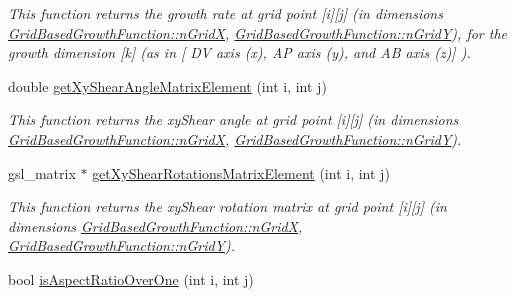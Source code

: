 \begin{DoxyCompactItemize}
\begin{DoxyCompactList}\small\item\em This function returns the growth rate at grid point \mbox{[}i\mbox{]}\mbox{[}j\mbox{]} (in dimensions \hyperlink{classGridBasedGrowthFunction_a6d36f433ad29dd4f36352900d3795469}{Grid\+Based\+Growth\+Function\+::n\+Grid\+X}, \hyperlink{classGridBasedGrowthFunction_ac992521b24e1975df1c7372c11285217}{Grid\+Based\+Growth\+Function\+::n\+Grid\+Y}), for the growth dimension \mbox{[}k\mbox{]} (as in \mbox{[} D\+V axis (x), A\+P axis (y), and A\+B axis (z)\mbox{]} ). \end{DoxyCompactList}\item 
\hypertarget{classGridBasedGrowthFunction_a5075a53329b3a0b73a5864b7ffb37c5d}{}double \hyperlink{classGridBasedGrowthFunction_a5075a53329b3a0b73a5864b7ffb37c5d}{get\+Xy\+Shear\+Angle\+Matrix\+Element} (int i, int j)\label{classGridBasedGrowthFunction_a5075a53329b3a0b73a5864b7ffb37c5d}

\begin{DoxyCompactList}\small\item\em This function returns the xy\+Shear angle at grid point \mbox{[}i\mbox{]}\mbox{[}j\mbox{]} (in dimensions \hyperlink{classGridBasedGrowthFunction_a6d36f433ad29dd4f36352900d3795469}{Grid\+Based\+Growth\+Function\+::n\+Grid\+X}, \hyperlink{classGridBasedGrowthFunction_ac992521b24e1975df1c7372c11285217}{Grid\+Based\+Growth\+Function\+::n\+Grid\+Y}). \end{DoxyCompactList}\item 
\hypertarget{classGridBasedGrowthFunction_a85ed4f6a4b5165adf1ab8806b885f81a}{}gsl\+\_\+matrix $\ast$ \hyperlink{classGridBasedGrowthFunction_a85ed4f6a4b5165adf1ab8806b885f81a}{get\+Xy\+Shear\+Rotations\+Matrix\+Element} (int i, int j)\label{classGridBasedGrowthFunction_a85ed4f6a4b5165adf1ab8806b885f81a}

\begin{DoxyCompactList}\small\item\em This function returns the xy\+Shear rotation matrix at grid point \mbox{[}i\mbox{]}\mbox{[}j\mbox{]} (in dimensions \hyperlink{classGridBasedGrowthFunction_a6d36f433ad29dd4f36352900d3795469}{Grid\+Based\+Growth\+Function\+::n\+Grid\+X}, \hyperlink{classGridBasedGrowthFunction_ac992521b24e1975df1c7372c11285217}{Grid\+Based\+Growth\+Function\+::n\+Grid\+Y}). \end{DoxyCompactList}\item 
\hypertarget{classGridBasedGrowthFunction_ab07937a18f72f31f4875225c1e246032}{}bool \hyperlink{classGridBasedGrowthFunction_ab07937a18f72f31f4875225c1e246032}{is\+Aspect\+Ratio\+Over\+One} (int i, int j)\label{classGridBasedGrowthFunction_ab07937a18f72f31f4875225c1e246032}


\end{DoxyCompactItemize}
